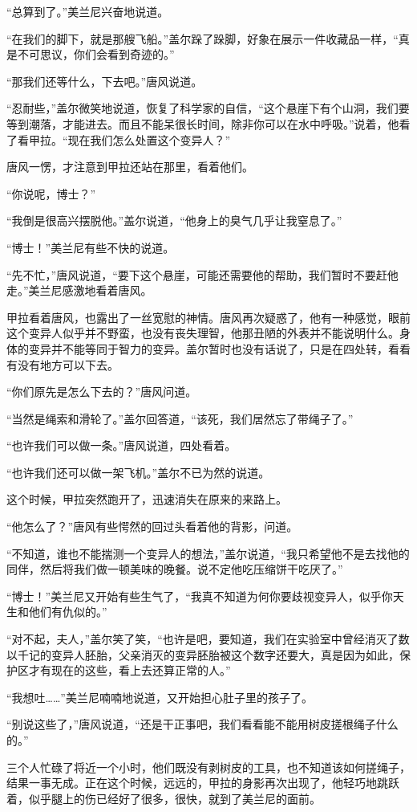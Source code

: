 “总算到了。”美兰尼兴奋地说道。

“在我们的脚下，就是那艘飞船。”盖尔跺了跺脚，好象在展示一件收藏品一样，“真是不可思议，你们会看到奇迹的。”

“那我们还等什么，下去吧。”唐风说道。

“忍耐些，”盖尔微笑地说道，恢复了科学家的自信，“这个悬崖下有个山洞，我们要等到潮落，才能进去。而且不能呆很长时间，除非你可以在水中呼吸。”说着，他看了看甲拉。“现在我们怎么处置这个变异人？”

唐风一愣，才注意到甲拉还站在那里，看着他们。

“你说呢，博士？”

“我倒是很高兴摆脱他。”盖尔说道，“他身上的臭气几乎让我窒息了。”

“博士！”美兰尼有些不快的说道。

“先不忙，”唐风说道，“要下这个悬崖，可能还需要他的帮助，我们暂时不要赶他走。”美兰尼感激地看着唐风。

甲拉看着唐风，也露出了一丝宽慰的神情。唐风再次疑惑了，他有一种感觉，眼前这个变异人似乎并不野蛮，也没有丧失理智，他那丑陋的外表并不能说明什么。身体的变异并不能等同于智力的变异。盖尔暂时也没有话说了，只是在四处转，看看有没有地方可以下去。

“你们原先是怎么下去的？”唐风问道。

“当然是绳索和滑轮了。”盖尔回答道，“该死，我们居然忘了带绳子了。”

“也许我们可以做一条。”唐风说道，四处看着。

“也许我们还可以做一架飞机。”盖尔不已为然的说道。

这个时候，甲拉突然跑开了，迅速消失在原来的来路上。

“他怎么了？”唐风有些愕然的回过头看着他的背影，问道。

“不知道，谁也不能揣测一个变异人的想法，”盖尔说道，“我只希望他不是去找他的同伴，然后将我们做一顿美味的晚餐。说不定他吃压缩饼干吃厌了。”

“博士！”美兰尼又开始有些生气了，“我真不知道为何你要歧视变异人，似乎你天生和他们有仇似的。”

“对不起，夫人，”盖尔笑了笑，“也许是吧，要知道，我们在实验室中曾经消灭了数以千记的变异人胚胎，父亲消灭的变异胚胎被这个数字还要大，真是因为如此，保护区才有现在的这些，看上去还算正常的人。”

“我想吐……”美兰尼喃喃地说道，又开始担心肚子里的孩子了。

“别说这些了，”唐风说道，“还是干正事吧，我们看看能不能用树皮搓根绳子什么的。”

三个人忙碌了将近一个小时，他们既没有剥树皮的工具，也不知道该如何搓绳子，结果一事无成。正在这个时候，远远的，甲拉的身影再次出现了，他轻巧地跳跃着，似乎腿上的伤已经好了很多，很快，就到了美兰尼的面前。

